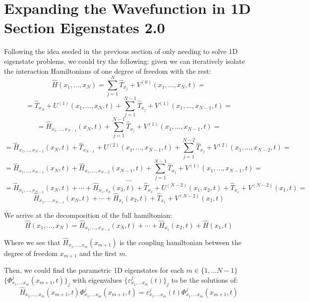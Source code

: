 \documentclass[11pt, a4paper]{article} %
\begin{document}
\section{Expanding the Wavefunction in 1D Section Eigenstates 2.0}
Following the idea seeded in the previous section of only needing to solve 1D eigenstate problems, we could try the following: given we can iteratively isolate the interaction Hamiltonians of one degree of freedom with the rest:
\begin{equation}
\hat{H}(x_1,...,x_N)=\sum_{j=1}^N \hat{T}_{x_j} + V^{(0)}(x_1,...,x_N,t)=
\end{equation}
$$
=\hat{T}_{x_N} + U^{(1)}(x_1,...,x_N,t) + \sum_{j=1}^{N-1} \hat{T}_{x_j} + V^{(1)}(x_1,...,x_{N-1},t)=
$$
$$
=\hat{H}_{x_1,...,x_{N-1}}(x_N,t)+\sum_{j=1}^{N-1} \hat{T}_{x_j} + V^{(1)}(x_1,...,x_{N-1},t)=
$$
$$
=\hat{H}_{x_1,...,x_{N-1}}(x_N,t)+\hat{T}_{x_{N-1}} + U^{(2)}(x_1,...,x_{N-1},t) + \sum_{j=1}^{N-2} \hat{T}_{x_j} + V^{(2)}(x_1,...,x_{N-2},t)=
$$
$$
=\hat{H}_{x_1,...,x_{N-1}}(x_N,t)+\hat{H}_{x_1,...,x_{N-2}}(x_{N-1},t)+\sum_{j=1}^{N-1} \hat{T}_{x_j} + V^{(1)}(x_1,...,x_{N-1},t)=
$$
$$
\cdots
$$
$$
=\hat{H}_{x_1,...,x_{N-1}}(x_N,t)+\cdots+\hat{H}_{x_1,x_2}(x_3,t)+\hat{T}_{x_{2}} + U^{(N-2)}(x_1,x_2,t) + \hat{T}_{x_1} + V^{(N-2)}(x_1,t)= 
$$
$$
\hat{H}_{x_1,...,x_{N-1}}(x_N,t)+\cdots+\hat{H}_{x_1}(x_2,t)+ \hat{T}_{x_1} + V^{(N-2)}(x_1,t)
$$

We arrive at the decomposition of the full hamiltonian:
\begin{equation}
\hat{H}(x_1,...,x_N)=\hat{H}_{x_1,...,x_{N-1}}(x_N,t)+\cdots+\hat{H}_{x_1}(x_2,t)+ \hat{H}(x_1,t)
\end{equation}

Where we see that $\hat{H}_{x_1,...,x_{m}}(x_{m+1})$ is the coupling hamiltonian between the degree of freedom $x_{m+1}$ and the first $m$.

Then, we could find the parametric 1D eigenstates for each $m\in\{1,...N-1\}$ $\{\Phi^j_{x_1,...x_m}(x_{m+1},t)\}_j$ with eigenvalues $\{ \varepsilon^j_{x_1,...x_m}(t) \}_j$ to be the solutions of:
\begin{equation}
\hat{H}_{x_1,...,x_m}(x_{m+1},t)\Phi^j_{x_1,...x_m}(x_{m+1},t) =  \varepsilon^j_{x_1,...x_m}(t) \Phi^j_{x_1,...x_m}(x_{m+1},t)
\end{equation}
\end{document}
